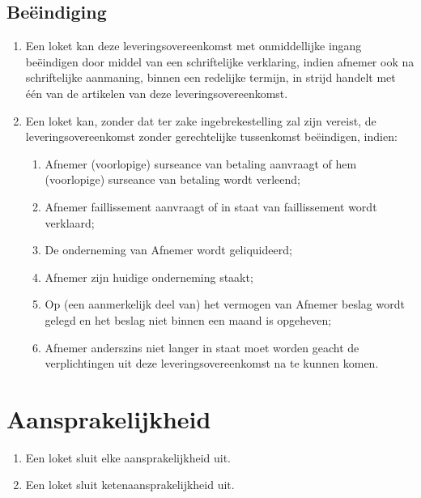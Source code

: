 \documentclass[10pt, a4paper]{article}
\begin{document}
\subsection*{Beëindiging}
\begin{enumerate}
   \item Een loket kan deze leveringsovereenkomst met onmiddellijke ingang beëindigen door middel van een schriftelijke verklaring, indien afnemer ook na schriftelijke aanmaning, binnen een redelijke termijn, in strijd handelt met één van de artikelen van deze leveringsovereenkomst.
   \item Een loket kan, zonder dat ter zake ingebrekestelling zal zijn vereist, de leveringsovereenkomst zonder gerechtelijke tussenkomst beëindigen, indien:
      \begin{enumerate}
      \item Afnemer (voorlopige) surseance van betaling aanvraagt of hem (voorlopige) surseance van betaling wordt verleend;
      \item Afnemer faillissement aanvraagt of in staat van faillissement wordt verklaard;
      \item De onderneming van Afnemer wordt geliquideerd;
      \item Afnemer zijn huidige onderneming staakt;
      \item Op (een aanmerkelijk deel van) het vermogen van Afnemer beslag wordt gelegd en het beslag niet binnen een maand is opgeheven;
      \item Afnemer anderszins niet langer in staat moet worden geacht de verplichtingen uit deze leveringsovereenkomst na te kunnen komen.
      \end{enumerate}
\end{enumerate}
\newpage


\section{Aansprakelijkheid}
\begin{enumerate}
   \item Een loket sluit elke aansprakelijkheid uit.
   \item Een loket sluit ketenaansprakelijkheid uit.
\end{enumerate}
\end{document}
